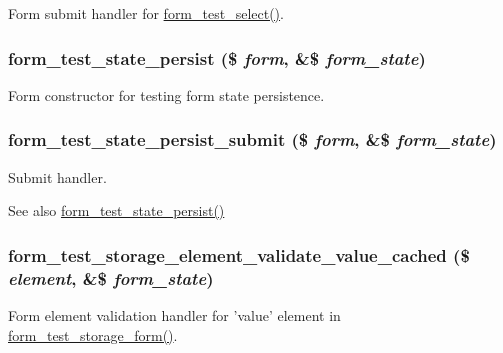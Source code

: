 \label{form__test_8module_abb8b9a150d748f82041c68da125d830f}
Form submit handler for \hyperlink{form__test_8module_af51824c91c240871d4499e82a97fe40e}{form\_\-test\_\-select()}. \hypertarget{form__test_8module_a5d7a4c512e68401d8dd332c78b078867}{
\subsubsection[{form\_\-test\_\-state\_\-persist}]{\setlength{\rightskip}{0pt plus 5cm}form\_\-test\_\-state\_\-persist (\$ {\em form}, \/  \&\$ {\em form\_\-state})}}
\label{form__test_8module_a5d7a4c512e68401d8dd332c78b078867}
Form constructor for testing form state persistence. \hypertarget{form__test_8module_ac78096c2e799eeff109fc9f8319496f2}{
\subsubsection[{form\_\-test\_\-state\_\-persist\_\-submit}]{\setlength{\rightskip}{0pt plus 5cm}form\_\-test\_\-state\_\-persist\_\-submit (\$ {\em form}, \/  \&\$ {\em form\_\-state})}}
\label{form__test_8module_ac78096c2e799eeff109fc9f8319496f2}
Submit handler.

\begin{DoxySeeAlso}{See also}
\hyperlink{form__test_8module_a5d7a4c512e68401d8dd332c78b078867}{form\_\-test\_\-state\_\-persist()} 
\end{DoxySeeAlso}
\hypertarget{form__test_8module_a5956b087bafac6839b4cee726df6195c}{
\subsubsection[{form\_\-test\_\-storage\_\-element\_\-validate\_\-value\_\-cached}]{\setlength{\rightskip}{0pt plus 5cm}form\_\-test\_\-storage\_\-element\_\-validate\_\-value\_\-cached (\$ {\em element}, \/  \&\$ {\em form\_\-state})}}
\label{form__test_8module_a5956b087bafac6839b4cee726df6195c}
Form element validation handler for 'value' element in \hyperlink{form__test_8module_a842b92f357259c64dc7b2d2906aeb1f3}{form\_\-test\_\-storage\_\-form()}.

